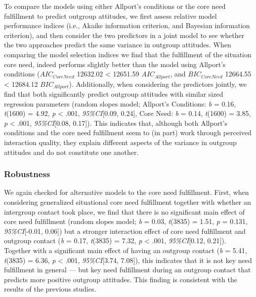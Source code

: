 To compare the models using either Allport's conditions or the core need
fulfillment to predict outgroup attitudes, we first assess relative
model performance indices (i.e., Akaike information criterion, and
Bayesian information criterion), and then consider the two predictors in
a joint model to see whether the two approaches predict the same
variance in outgroup attitudes. When comparing the model selection
indices we find that the fulfillment of the situation core need, indeed
performs slightly better than the model using Allport's conditions
(\(AIC_{CoreNeed}\) 12632.02 \textless{} 12651.59 \(AIC_{Allport}\), and
\(BIC_{CoreNeed}\) 12664.55 \textless{} 12684.12 \(BIC_{Allport}\)).
Additionally, when considering the predictors jointly, we find that both
significantly predict outgroup attitudes with similar sized regression
parameters (random slopes model; Allport's Conditions: \textit{b} =
0.16, \textit{t}(1600) = 4.92, \textit{p} \textless{} .001,
\textit{95\%CI}{[}0.09, 0.24{]}, Core Need: \textit{b} = 0.14,
\textit{t}(1600) = 3.85, \textit{p} \textless{} .001,
\textit{95\%CI}{[}0.08, 0.17{]}). This indicates that, although both
Allport's conditions and the core need fulfillment seem to (in part)
work through perceived interaction quality, they explain different
aspects of the variance in outgroup attitudes and do not constitute one
another.

\subsubsection{Robustness}

We again checked for alternative models to the core need fulfillment.
First, when considering generalized situational core need fulfillment
together with whether an intergroup contact took place, we find that
there is no significant main effect of core need fulfillment (random
slopes model; \textit{b} = 0.03, \textit{t}(3835) = 1.51, \textit{p} =
0.131, \textit{95\%CI}{[}-0.01, 0.06{]}) but a stronger interaction
effect of core need fulfillment and outgroup contact (\textit{b} = 0.17,
\textit{t}(3835) = 7.32, \textit{p} \textless{} .001,
\textit{95\%CI}{[}0.12, 0.21{]}). Together with a significant main
effect of having an outgroup contact (\textit{b} = 5.41,
\textit{t}(3835) = 6.36, \textit{p} \textless{} .001,
\textit{95\%CI}{[}3.74, 7.08{]}), this indicates that it is not key need
fulfillment in general --- but key need fulfillment during an outgroup
contact that predicts more positive outgroup attitudes. This finding is
consistent with the results of the previous studies.

